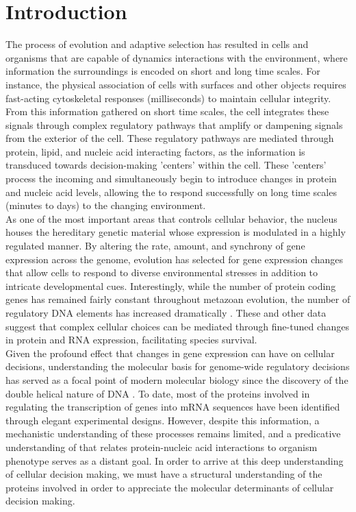 \chapter{Introduction}

\indent The process of evolution and adaptive selection has resulted in cells and organisms that are capable of dynamics interactions with the environment, where information the surroundings is encoded on short and long time scales. For instance, the physical association of cells with surfaces and other objects requires fast-acting cytoskeletal responses (milliseconds) to maintain cellular integrity. From this information gathered on short time scales, the cell integrates these signals through complex regulatory pathways that amplify or dampening signals from the exterior of the cell. These regulatory pathways are mediated through protein, lipid, and nucleic acid interacting factors, as the information is transduced towards decision-making 'centers' within the cell.  These 'centers' process the incoming and simultaneously begin to introduce changes in protein and nucleic acid levels, allowing the to respond successfully on long time scales (minutes to days) to the changing environment.\\
\indent As one of the most important areas that controls cellular behavior, the nucleus houses the hereditary genetic material whose expression is modulated in a highly regulated manner. By altering the rate, amount, and synchrony of gene expression across the genome, evolution has selected for gene expression changes that allow cells to respond to diverse environmental stresses in addition to intricate developmental cues. Interestingly, while the number of protein coding genes has remained fairly constant throughout metazoan evolution, the number of regulatory DNA elements has increased dramatically \cite{Levine_1710}. These and other data suggest that complex cellular choices can be mediated through fine-tuned changes in protein and RNA expression, facilitating species survival. \\
\indent Given the profound effect that changes in gene expression can have on cellular decisions, understanding the molecular basis for genome-wide regulatory decisions has served as a focal point of modern molecular biology since the discovery of the double helical nature of DNA \cite{Watson_4017}. To date, most of the proteins involved in regulating the transcription of genes into mRNA sequences have been identified through elegant experimental designs.  However, despite this information, a mechanistic understanding of these processes remains limited, and a predicative understanding of that relates protein-nucleic acid interactions to organism phenotype serves as a distant goal. In order to arrive at this deep understanding of cellular decision making, we must have a structural understanding of the proteins involved in order to appreciate the molecular determinants of cellular decision making. 

